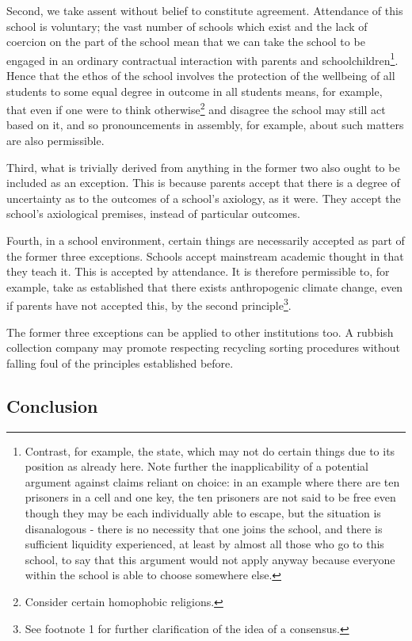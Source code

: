 \documentclass[12pt,a4paper]{report}
\begin{document}
\begin{multicols}{2}
Second, we take assent without belief to constitute agreement.
Attendance of this school is voluntary; the vast number of schools which
exist and the lack of coercion on the part of the school mean that we
can take the school to be engaged in an ordinary contractual interaction
with parents and schoolchildren\footnote{Contrast, for example, the
	state, which may not do certain things due to its position as already
	here. Note further the inapplicability of a potential argument against
	claims reliant on choice: in an example where there are ten prisoners
	in a cell and one key, the ten prisoners are not said to be free even
	though they may be each individually able to escape, but the situation
	is disanalogous - there is no necessity that one joins the school, and
	there is sufficient liquidity experienced, at least by almost all
	those who go to this school, to say that this argument would not apply
	anyway because everyone within the school is able to choose somewhere
	else.}. Hence that the ethos of the school involves the protection of
the wellbeing of all students to some equal degree in outcome in all
students means, for example, that even if one were to think
otherwise\footnote{Consider certain homophobic religions.} and disagree
the school may still act based on it, and so pronouncements in assembly,
for example, about such matters are also permissible.

Third, what is trivially derived from anything in the former two also
ought to be included as an exception. This is because parents accept
that there is a degree of uncertainty as to the outcomes of a school's
axiology, as it were. They accept the school's axiological premises,
instead of particular outcomes.

Fourth, in a school environment, certain things are necessarily accepted
as part of the former three exceptions. Schools accept mainstream
academic thought in that they teach it. This is accepted by attendance.
It is therefore permissible to, for example, take as established that
there exists anthropogenic climate change, even if parents have not
accepted this, by the second principle\footnote{See footnote 1 for
	further clarification of the idea of a consensus.}.

The former three exceptions can be applied to other institutions too. A
rubbish collection company may promote respecting recycling sorting
procedures without falling foul of the principles established before.

\subsection{Conclusion}\label{conclusion}


\end{multicols}
\end{document}
